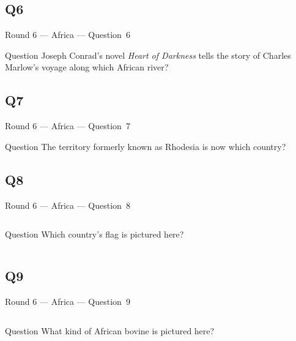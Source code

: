 \documentclass[11pt]{beamer}
\begin{document}
\subsection*{Q6}
\begin{frame}[t]{Round 6 --- Africa --- \mbox{Question 6}}
\vspace{-0.5em}
\begin{block}{Question}
Joseph Conrad's novel \emph{Heart of Darkness} tells the story of Charles Marlow's voyage along which African river?
\end{block}
\end{frame}
\subsection*{Q7}
\begin{frame}[t]{Round 6 --- Africa --- \mbox{Question 7}}
\vspace{-0.5em}
\begin{block}{Question}
The territory formerly known as Rhodesia is now which country?
\end{block}
\end{frame}
\subsection*{Q8}
\begin{frame}[t]{Round 6 --- Africa --- \mbox{Question 8}}
\vspace{-0.5em}
\begin{columns}[T,totalwidth=\linewidth]
\begin{column}{0.32\linewidth}
\begin{block}{Question}
Which country's flag is pictured here?
\end{block}
\end{column}
\begin{column}{0.65\linewidth}
\begin{center}
\texttt{[image: \{Images/ghana]}.png}
\end{center}
\end{column}
\end{columns}
\end{frame}
\subsection*{Q9}
\begin{frame}[t]{Round 6 --- Africa --- \mbox{Question 9}}
\vspace{-0.5em}
\begin{columns}[T,totalwidth=\linewidth]
\begin{column}{0.32\linewidth}
\begin{block}{Question}
What kind of African bovine is pictured here?
\end{block}
\end{column}
\begin{column}{0.65\linewidth}
\begin{center}
\texttt{[image: \{Images/gnu]}.jpg}
\end{center}
\end{column}
\end{columns}
\end{frame}
\end{document}
